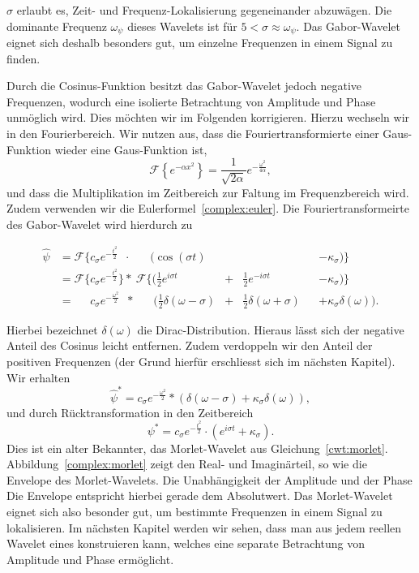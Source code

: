 $\sigma$ erlaubt es, Zeit- und Frequenz-Lokalisierung gegeneinander abzuwägen.
Die dominante Frequenz $\omega_\psi$ dieses Wavelets ist für $5 < \sigma \approx \omega_\psi$.
Das Gabor-Wavelet eignet sich deshalb besonders gut, um einzelne Frequenzen in einem Signal zu finden.

Durch die Cosinus-Funktion besitzt das Gabor-Wavelet jedoch negative Frequenzen, wodurch eine isolierte Betrachtung von Amplitude und Phase unmöglich wird.
Dies möchten wir im Folgenden korrigieren.
Hierzu wechseln wir in den Fourierbereich.
Wir nutzen aus, dass die Fouriertransformierte einer Gaus-Funktion wieder eine Gaus-Funktion ist,
\[
	\mathcal{F}\left\lbrace e^{-\alpha x^2} \right\rbrace 
	= \frac{1}{\sqrt{2\alpha}}e^{- \frac{\omega^2}{4\alpha}},
\]
und dass die Multiplikation im Zeitbereich zur Faltung im Frequenzbereich wird.
Zudem verwenden wir die Eulerformel~\eqref{complex:euler}.
Die Fouriertransformeirte des Gabor-Wavelet wird hierdurch zu

\begin{equation*}
\begin{aligned}
 \hat{\psi}
 & = \mathcal{F}\Bigg\lbrace c_\sigma e^{-\frac{t^2}{2}}\phantom{\Bigg\rbrace}
 \cdot\; \phantom{\mathcal{F}\Bigg\lbrace}
 \Bigg(\cos\left(\sigma t\right) &&
 &&- \kappa_\sigma\Bigg) \Bigg\rbrace \\
 & = \mathcal{F}\Bigg\lbrace c_\sigma e^{-\frac{t^2}{2}} \Bigg\rbrace 
 *\: \mathcal{F}\Bigg\lbrace\Bigg( \frac12 e^{i\sigma t} &+& \frac12 e^{-i\sigma t}
 &&- \kappa_\sigma \Bigg)\Bigg\rbrace\\
 & = \phantom{\mathcal{F}\Bigg\lbrace} c_\sigma e^{- \frac{\omega^2}{2}} \phantom{\Big\rbrace}
 *\:\phantom{\mathcal{F}\Bigg\lbrace} \Bigg(
  \frac{1}{2}\delta(\omega - \sigma) &+&
  \frac{1}{2}\delta(\omega + \sigma) 
 && + \kappa_\sigma\delta(\omega)
  \Bigg).
\end{aligned}
\end{equation*}

Hierbei bezeichnet $\delta(\omega)$ die Dirac-Distribution.
Hieraus lässt sich der negative Anteil des Cosinus leicht entfernen.
Zudem verdoppeln wir den Anteil der positiven Frequenzen (der Grund hierfür erschliesst sich im nächsten Kapitel).
Wir erhalten
\[
	\hat{\psi}^\ast = 
	c_\sigma e^{- \frac{\omega^2}{2}} * \left(
	\delta(\omega - \sigma) +
	\kappa_\sigma\delta(\omega)
	\right),
\]
und durch Rücktransformation in den Zeitbereich
\[
	\psi^\ast = 
	c_\sigma e^{- \frac{t^2}{2}} \cdot \left(
	e^{i\sigma t} +
	\kappa_\sigma
	\right).
\]
Dies ist ein alter Bekannter, das Morlet-Wavelet aus Gleichung~\eqref{cwt:morlet}.
Abbildung~\ref{complex:morlet} zeigt den Real- und Imaginärteil, so wie die Envelope des Morlet-Wavelets.
Die Unabhängigkeit der Amplitude und der Phase 
Die Envelope entspricht hierbei gerade dem Absolutwert.
Das Morlet-Wavelet eignet sich also besonder gut, um bestimmte Frequenzen in einem Signal zu lokalisieren.
Im nächsten Kapitel werden wir sehen, dass man aus jedem reellen Wavelet eines konstruieren kann, welches eine separate Betrachtung von Amplitude und Phase ermöglicht.

